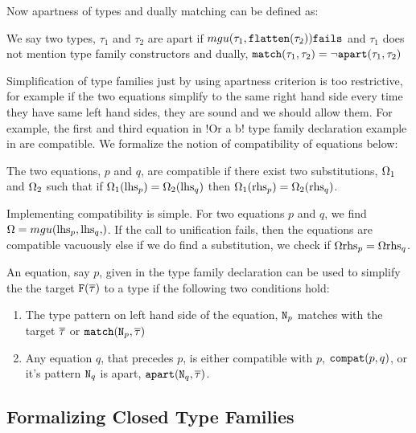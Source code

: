 \documentclass[format=sigplan,manuscript,review,screen,nonacm,margin=1in]{acmart}
\begin{document}
Now apartness of types and dually matching can be defined as:
\begin{defn}\label{def:apart-match-ty}
  We say two types, $\tau_1$ and $\tau_2$ are apart if $mgu(\tau_1,\texttt{flatten}(\tau_2))\texttt{fails}$ and $\tau_1$ does not
  mention type family constructors and dually, $\texttt{match}(\tau_1, \tau_2) = \lnot\texttt{apart}(\tau_1, \tau_2)$
\end{defn}
Simplification of type families just by using apartness criterion is too restrictive,
for example if the two equations simplify to the
same right hand side every time they have same left hand sides,
they are sound and we should allow them. For example, the first and third equation in
!Or a b! type family declaration example in  are compatible.
We formalize the notion of compatibility of equations below:
\begin{defn}\label{def:compact-eq}
  The two equations, $p$ and $q$, are compatible
  if there exist two substitutions, $\Omega_1$ and $\Omega_2$ such that
  if $\Omega_1(\text{lhs}_{p}) = \Omega_2(\text{lhs}_{q})$ then $\Omega_1(\text{rhs}_{p}) = \Omega_2(\text{rhs}_{q})$.
\end{defn}
Implementing compatibility is simple. For two equations $p$ and $q$, we find $\Subst = \mgu{\lhs p, \lhs q}$.
If the call to unification fails, then the equations are compatible vacuously else if we do find a substitution,
we check if $\Omega\text{rhs}_{p} = \Omega\text{rhs}_{q}$. 
\begin{defn}\label{def:cft-simpl}
  An equation, say $p$, given in the type family declaration can be used to simplify the the
  target $\texttt{F}(\overline{\tau})$ to a type if the following two conditions hold:
  \begin{enumerate}
  \item The type pattern on left hand side of the equation, $\texttt{N}_p$ matches with the
    target $\overline{\tau}$ or $\texttt{match}(\texttt{N}_p, \overline{\tau})$
  \item Any equation $q$, that precedes $p$, is either compatible with $p$, $\texttt{compat}(p, q)$,
    or it's pattern $\texttt{N}_q$ is apart, $\texttt{apart}(\texttt{N}_q, \overline{\tau})$.
  \end{enumerate}
\end{defn}


\subsection{Formalizing Closed Type Families}\label{subsec:tf-closed-formal}
\end{document}
